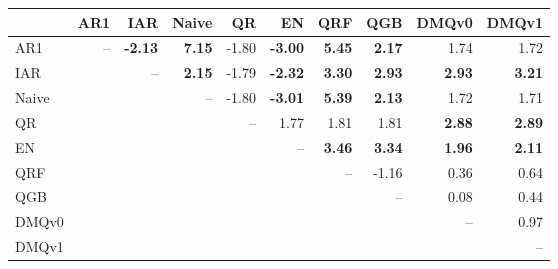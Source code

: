 \begin{tabular}{lrrrrrrrrr}
\toprule
 & AR1 & IAR & Naive & QR & EN & QRF & QGB & DMQv0 & DMQv1 \\
\midrule
AR1 & -- & \textbf{-2.13} & \textbf{7.15} & -1.80 & \textbf{-3.00} & \textbf{5.45} & \textbf{2.17} & 1.74 & 1.72 \\
IAR &  & -- & \textbf{2.15} & -1.79 & \textbf{-2.32} & \textbf{3.30} & \textbf{2.93} & \textbf{2.93} & \textbf{3.21} \\
Naive &  &  & -- & -1.80 & \textbf{-3.01} & \textbf{5.39} & \textbf{2.13} & 1.72 & 1.71 \\
QR &  &  &  & -- & 1.77 & 1.81 & 1.81 & \textbf{2.88} & \textbf{2.89} \\
EN &  &  &  &  & -- & \textbf{3.46} & \textbf{3.34} & \textbf{1.96} & \textbf{2.11} \\
QRF &  &  &  &  &  & -- & -1.16 & 0.36 & 0.64 \\
QGB &  &  &  &  &  &  & -- & 0.08 & 0.44 \\
DMQv0 &  &  &  &  &  &  &  & -- & 0.97 \\
DMQv1 &  &  &  &  &  &  &  &  & -- \\
\bottomrule
\end{tabular}
